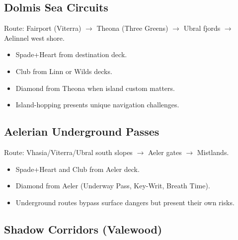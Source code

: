 \subsection{Dolmis Sea Circuits}
\label{subsec:dolmis-circuits}

Route: Fairport (Viterra) $\rightarrow$ Theona (Three Greens) $\rightarrow$ Ubral fjords $\rightarrow$ Aelinnel west shore.

\begin{itemize}
\item Spade+Heart from destination deck.
\item Club from Linn or Wilds decks.
\item Diamond from Theona when island custom matters.
\item Island-hopping presents unique navigation challenges.
\end{itemize}

\subsection{Aelerian Underground Passes}
\label{subsec:aelerian-passes}

Route: Vhasia/Viterra/Ubral south slopes $\rightarrow$ Aeler gates $\rightarrow$ Mistlands.

\begin{itemize}
\item Spade+Heart and Club from Aeler deck.
\item Diamond from Aeler (Underway Pass, Key-Writ, Breath Time).
\item Underground routes bypass surface dangers but present their own risks.
\end{itemize}

\subsection{Shadow Corridors (Valewood)}
\label{subsec:shadow-corridors}

